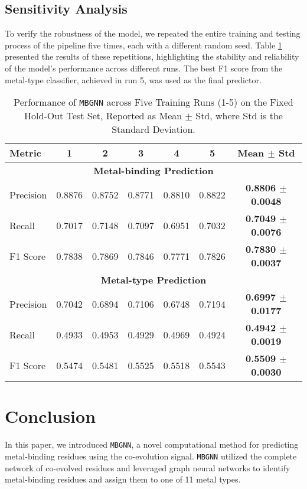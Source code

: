 \documentclass[letterpaper, 10 pt, conference]{ieeeconf}
\begin{document}
\subsection{Sensitivity Analysis}
\label{subsec:sens}
To verify the robustness of the model, we repeated the entire training and testing process of the pipeline five times, each with a different random seed. Table \ref{tab:mbgnn_results} presented the results of these repetitions, highlighting the stability and reliability of the model's performance across different runs. The best F1 score from the metal-type classifier, achieved in run 5, was used as the final predictor.


\begin{table}[t]
\centering
\caption{Performance of \texttt{MBGNN} across Five Training Runs (1-5) on the Fixed Hold-Out Test Set, Reported as Mean $\pm$ Std, where Std is the Standard Deviation.}
\label{tab:mbgnn_results}
\renewcommand{\arraystretch}{1.1} %
\setlength{\tabcolsep}{3pt} %
\begin{tabular}{l|ccccc|c}
\hline
\textbf{Metric} & \textbf{1} & \textbf{2} & \textbf{3} & \textbf{4} & \textbf{5} & \textbf{Mean $\pm$ Std} \\ \hline
\multicolumn{7}{c}{\textbf{Metal-binding Prediction}} \\ \hline
Precision  & 0.8876 & 0.8752 & 0.8771 & 0.8810 & 0.8822 & \textbf{0.8806 $\pm$ 0.0048} \\
Recall     & 0.7017 & 0.7148 & 0.7097 & 0.6951 & 0.7032 & \textbf{0.7049 $\pm$ 0.0076} \\
F1 Score   & 0.7838 & 0.7869 & 0.7846 & 0.7771 & 0.7826 & \textbf{0.7830 $\pm$ 0.0037} \\ \hline
\multicolumn{7}{c}{\textbf{Metal-type Prediction}} \\ \hline
Precision  & 0.7042 & 0.6894 & 0.7106 & 0.6748 & 0.7194 & \textbf{0.6997 $\pm$ 0.0177} \\
Recall     & 0.4933 & 0.4953 & 0.4929 & 0.4969 & 0.4924 & \textbf{0.4942 $\pm$ 0.0019} \\
F1 Score   & 0.5474 & 0.5481 & 0.5525 & 0.5518 & 0.5543 & \textbf{0.5509 $\pm$ 0.0030} \\ \hline
\end{tabular}
\vspace{-5pt}
\end{table}


\section{Conclusion}
In this paper, we introduced \texttt{MBGNN}, a novel computational method for predicting metal-binding residues using the co-evolution signal. \texttt{MBGNN} utilized the complete network of co-evolved residues and leveraged graph neural networks to identify metal-binding residues and assign them to one of 11 metal types. 
\end{document}
